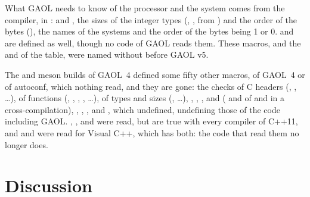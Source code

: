 \noindent
What GAOL needs to know of the processor and the system comes from the
compiler, in :  and
, the sizes of the integer types
(, , from
) and the order of the bytes (),
the names of the systems and the order of the bytes being 1 or 0.
 and  are defined as well,
though no code of GAOL reads them. These macros, and the
 and  of the table, were named
without  before GAOL v5.\newinvfive

\begin{Rem}
The  and meson builds of GAOL~4 defined some fifty other
macros, of GAOL~4 or of autoconf, which nothing read, and they are
gone:\newinvfive{} the checks of C headers (,
, \ldots), of functions
(, , ,
, \ldots), of types and sizes
(, \ldots), ,
, ,  and 
( and  of 
and  in a cross-compilation),
, , , 
and , which  undefined, undefining
those of the code including GAOL. , ,
 and  were read, but are true
with every compiler of C++11, and  and
 were read for Visual C++, which has both: the code that
read them no longer does.
\end{Rem}

\section{Discussion}

